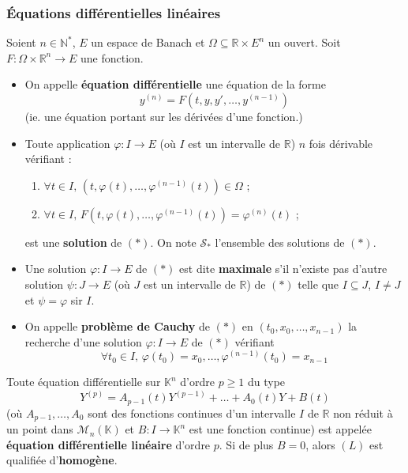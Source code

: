   \subsubsection{Équations différentielles linéaires}


  \begin{definition}
    Soient $n \in \mathbb{N}^*$, $E$ un espace de Banach et $\Omega \subseteq \mathbb{R} \times E^n$ un ouvert. Soit $F : \Omega \times \mathbb{R}^n \rightarrow E$ une fonction.
    \begin{itemize}
      \item On appelle \textbf{équation différentielle} une équation de la forme
      \[ y^{(n)} = F(t, y, y', \dots, y^{(n-1)}) \tag{$*$} \]
      (ie. une équation portant sur les dérivées d'une fonction.)
      \item Toute application $\varphi : I \rightarrow E$ (où $I$ est un intervalle de $\mathbb{R}$) $n$ fois dérivable vérifiant :
      \begin{enumerate}[label=(\roman*)]
        \item $\forall t \in I, \, (t, \varphi(t), \dots, \varphi^{(n-1)}(t)) \in \Omega$ ;
        \item $\forall t \in I, \, F(t, \varphi(t), \dots, \varphi^{(n-1)}(t)) = \varphi^{(n)}(t)$ ;
      \end{enumerate}
      est une \textbf{solution} de $(*)$. On note $\mathcal{S}_*$ l'ensemble des solutions de $(*)$.
      \item Une solution $\varphi : I \rightarrow E$ de $(*)$ est dite \textbf{maximale} s'il n'existe pas d'autre solution $\psi : J \rightarrow E$ (où $J$ est un intervalle de $\mathbb{R}$) de $(*)$ telle que $I \subseteq J$, $I \neq J$ et $\psi = \varphi$ sir $I$.
      \item On appelle \textbf{problème de Cauchy} de $(*)$ en $(t_0, x_0, \dots, x_{n-1})$ la recherche d'une solution $\varphi : I \rightarrow E$ de $(*)$ vérifiant
      \[ \forall t_0 \in I, \, \varphi(t_0) = x_0, \dots, \varphi^{(n-1)}(t_0) = x_{n-1} \]
    \end{itemize}
  \end{definition}


  \begin{definition}
    Toute équation différentielle sur $\mathbb{K}^n$ d'ordre $p \geq 1$ du type
    \[ Y^{(p)} = A_{p-1}(t) Y^{(p-1)} + \dots + A_0(t) Y + B(t) \tag{$L$} \]
    (où $A_{p-1}, \dots, A_0$ sont des fonctions continues d'un intervalle $I$ de $\mathbb{R}$ non réduit à un point dans $\mathcal{M}_n(\mathbb{K})$ et $B : I \rightarrow \mathbb{K}^n$ est une fonction continue) est appelée \textbf{équation différentielle linéaire} d'ordre $p$.
    \newpar
    Si de plus $B = 0$, alors $(L)$ est qualifiée d'\textbf{homogène}.
  \end{definition}


